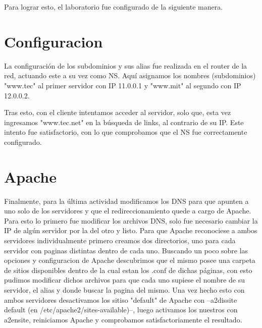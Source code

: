 \documentclass[12pt,a4paper]{article}
\begin{document}
	Para lograr esto, el laboratorio fue configurado de la siguiente manera.
	
	\section{Configuracion}
	La configuración de los subdominios y sus alias fue realizada en el router de la red, actuando este a su vez como NS. Aquí asignamos los nombres (subdominios)  "www.tec" al primer servidor con IP 11.0.0.1 y "www.mit" al segundo con IP 12.0.0.2.
	
	Tras esto, con el cliente intentamos acceder al servidor, solo que, esta vez ingresamos "www.tec.net" en la búsqueda de links, al contrario de su IP.
	Este intento fue satisfactorio, con lo que comprobamos que el NS fue correctamente configurado.
	
	
	\section{Apache}
	
	Finalmente, para la última actividad modificamos los DNS para que apunten a uno solo de los servidores y que el redireccionamiento quede a cargo de Apache.
	Para esto lo primero fue modificar los archivos DNS, solo fue necesario cambiar la IP de algún servidor por la del otro y listo.
	Para que Apache reconociese a ambos servidores individualmente primero creamos dos directorios, uno para cada servidor con paginas distintas dentro de cada uno.
	Buscando un poco sobre las opciones y configuracion de Apache descubrimos que el mismo posee una carpeta de sitios disponibles dentro de la cual estan los .conf de dichas páginas, con esto pudimos modificar dichos archivos para que cada uno supiese el nombre de su servidor, el alias y donde buscar la pagina del mismo.
	Una vez hecho esto con ambos servidores desactivamos los sitiso "default" de Apache con --a2dissite default (en /etc/apache2/sites-available)--, luego activamos los nuestros con a2ensite, reiniciamos Apache y comprobamos satisfactoriamente el resultado. 
\end{document}
